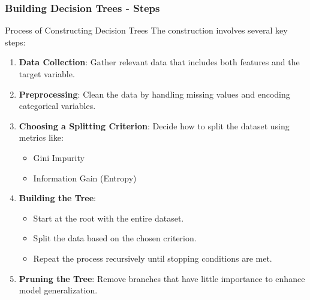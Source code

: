 \documentclass[aspectratio=169]{beamer}
\begin{document}
\begin{frame}[fragile]
    \frametitle{Building Decision Trees - Steps}
    \begin{block}{Process of Constructing Decision Trees}
        The construction involves several key steps:
        \begin{enumerate}
            \item \textbf{Data Collection}: Gather relevant data that includes both features and the target variable.
            \item \textbf{Preprocessing}: Clean the data by handling missing values and encoding categorical variables.
            \item \textbf{Choosing a Splitting Criterion}: Decide how to split the dataset using metrics like:
                \begin{itemize}
                    \item Gini Impurity
                    \item Information Gain (Entropy)
                \end{itemize}
            \item \textbf{Building the Tree}:
                \begin{itemize}
                    \item Start at the root with the entire dataset.
                    \item Split the data based on the chosen criterion.
                    \item Repeat the process recursively until stopping conditions are met.
                \end{itemize}
            \item \textbf{Pruning the Tree}: Remove branches that have little importance to enhance model generalization.
        \end{enumerate}
    \end{block}
\end{frame}
\end{document}
